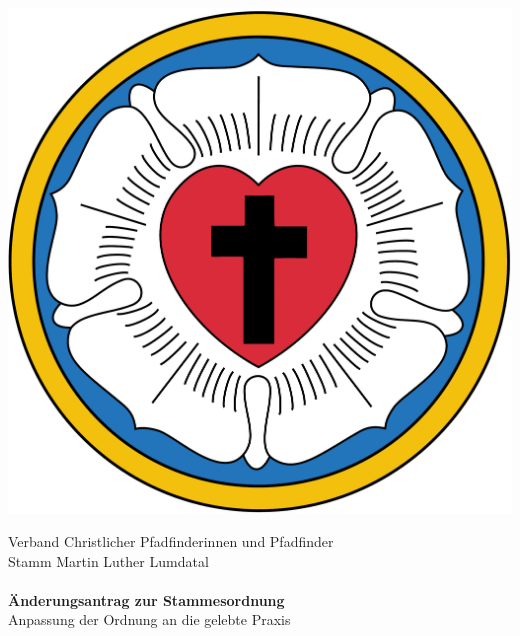\documentclass[a4paper]{article}
\begin{document}
\begin{center}
    \begin{minipage}{.2\textwidth}
        \flushleft
        \includegraphics[width=1\linewidth]{Lutherrose.pdf}
    \end{minipage}%
    \begin{minipage}{.6\textwidth}
        \begin{center}
            \footnotesize Verband Christlicher Pfadfinderinnen und Pfadfinder\\
            \large Stamm Martin Luther Lumdatal\\
            ~\\
            \Large \textbf{Änderungsantrag zur Stammesordnung}\\
            \normalsize Anpassung der Ordnung an die gelebte Praxis\\
            ~\\
        \end{center}
    \end{minipage}%
    \begin{minipage}{.2\textwidth}
        \flushright

\end{minipage}
\end{center}
\end{document}
